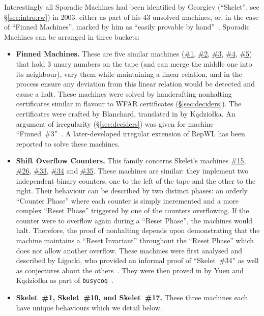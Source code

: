 \documentclass[sigconf,screen]{acmart}
\theoremstyle{definition} %
\numberwithin{equation}{section}
\theoremstyle{definition} %
\begin{document}
Interestingly all Sporadic Machines had been identified by Georgiev (``Skelet'', see \S\ref{sec:intro:rw}) in 2003: either as part of his 43 unsolved machines, or, in the case of ``Finned Machines'', marked by him as ``easily provable by hand''~\cite{Skelet_bbfind_list}. Sporadic Machines can be arranged in three buckets:
\begin{itemize}
    \item \textbf{Finned Machines.} These are five similar machines (\href{https://bbchallenge.org/1RB0LE_1RC1RB_1RD1LC_0LE0RB_---1LA}{\#1}, \href{https://bbchallenge.org/1RB1RA_1RC1LB_0LD0RA_1RA1LE_---0LD}{\#2}, \href{https://bbchallenge.org/1RB1RE_1LC1RB_0RA0LD_1LB1LD_---0RA}{\#3}, \href{https://bbchallenge.org/1RB1LA_0LC0RE_---1LD_1RA0LC_1RA1RE}{\#4}, \href{https://bbchallenge.org/1RB1LA_0LC0RE_---1LD_1LA0LC_1RA1RE}{\#5}) that hold 3 unary numbers on the tape (and can merge the middle one into its neighbour), vary them while maintaining a linear relation, and in the process ensure any deviation from this linear relation would be detected and cause a halt. These machines were solved by handcrafting nonhalting certificates similar in flavour to WFAR certificates (\S\ref{sec:deciders}). The certificates were crafted by Blanchard, translated in \Coq by K\k{a}dzio{\l}ka. An argument of irregularity (\S\ref{sec:deciders}) was given for machine ``Finned~\#3''~\cite{irregularFinned3}. A later-developed irregular extension of RepWL has been reported to solve these machines.
    \item \textbf{Shift Overflow Counters.} This family concerns Skelet's machines \href{https://bbchallenge.org/1RB---_1RC1LB_1LD1RE_1LB0LD_1RA0RC}{\#15}, \href{https://bbchallenge.org/1RB1LD_1RC0RB_1LA1RC_1LE0LA_1LC---}{\#26}, \href{https://bbchallenge.org/1RB1LC_0RC0RB_1LD0LA_1LE---_1LA1RE}{\#33}, \href{https://bbchallenge.org/1RB1LC_0RC0RB_1LD0LA_1LE---_1LA1RA}{\#34} and \href{https://bbchallenge.org/1RB1LC_0RC0RB_1LD0LA_1LE---_1LA0LA}{\#35}. These machines are similar: they implement two independent binary counters, one to the left of the tape and the other to the right. Their behaviour can be described by two distinct phases: an orderly ``Counter Phase'' where each counter is simply incremented and a more complex ``Reset Phase'' triggered by one of the counters overflowing. If the counter were to overflow again during a ``Reset Phase'', the machines would halt. Therefore, the proof of nonhalting depends upon demonstrating that the machine maintains a ``Reset Invariant'' throughout the ``Reset Phase'' which does not allow another overflow. These machines were first analysed and described by Ligocki, who provided an informal proof of ``Skelet~\#34'' as well as conjectures about the others~\cite{ShawnSOC}. They were then proved in \Coq by Yuen and K\k{a}dzio{\l}ka as part of \texttt{busycoq}~\cite{busycoq}.
    \item \textbf{Skelet~\#1, Skelet~\#10, and Skelet~\#17.} These three machines each have unique behaviours which we detail below.
\end{itemize}
\end{document}
